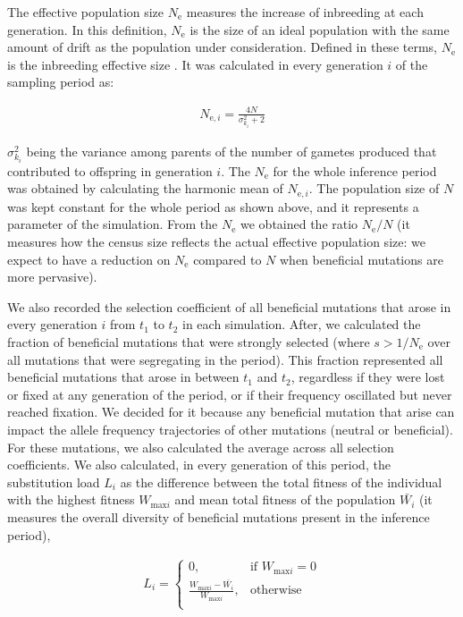 \documentclass[a4paper, 12pt]{article}
\begin{document}
The effective population size $N_{\mathrm{e}}$ measures the increase of inbreeding at each generation. In this definition, $N_{\mathrm{e}}$ is the size of an ideal population with the same amount of drift as the population under consideration. Defined in these terms, $N_{\mathrm{e}}$ is the inbreeding effective size \citep{Santiago:1995wx, Walsh:2018tv}. It was calculated in every generation $i$ of the sampling period as:

\begin{gather*}
    N_{\mathrm{e},i} = \frac{4N}{\sigma^2_{k_i} + 2} 
\end{gather*}

\noindent $\sigma^2_{k_i}$ being the variance among parents of the number of gametes produced that contributed to offspring in generation $i$. The $N_\mathrm{e}$ for the whole inference period was obtained by calculating the harmonic mean of $N_{\mathrm{e},i}$. The population size of $N$ was kept constant for the whole period as shown above, and it represents a parameter of the simulation. From the $N_\mathrm{e}$ we obtained the ratio $N_\mathrm{e}/N$ (it measures how the census size reflects the actual effective population size: we expect to have a reduction on $N_{\mathrm{e}}$ compared to $N$ when beneficial mutations are more pervasive). 

We also recorded the selection coefficient of all beneficial mutations that arose in every generation $i$ from $t_1$ to $t_2$ in each simulation. After, we calculated the fraction of beneficial mutations that were strongly selected (where $s > 1/N_{\mathrm{e}}$ over all mutations that were segregating in the period). This fraction represented all beneficial mutations that arose in between $t_1$ and $t_2$, regardless if they were lost or fixed at any generation of the period, or if their frequency oscillated but never reached fixation. We decided for it because any beneficial mutation that arise can impact the allele frequency trajectories of other mutations (neutral or beneficial). For these mutations, we also calculated the average across all selection coefficients. We also calculated, in every generation of this period, the substitution load $L_i$ as the difference between the total fitness of the individual with the highest fitness $W_{\mathrm{max}i}$ and mean total fitness of the population $\bar{W_{i}}$ (it measures the overall diversity of beneficial mutations present in the inference period),

\begin{gather*}
    L_i = 
\begin{cases}
    0, & \text{if } W_{\mathrm{max}i}=0\\
    \frac{W_{\mathrm{max}i} - \bar{W_{i}}}{W_{\mathrm{max}i}},& \text{otherwise}\\
\end{cases}
\end{gather*}
\end{document}
